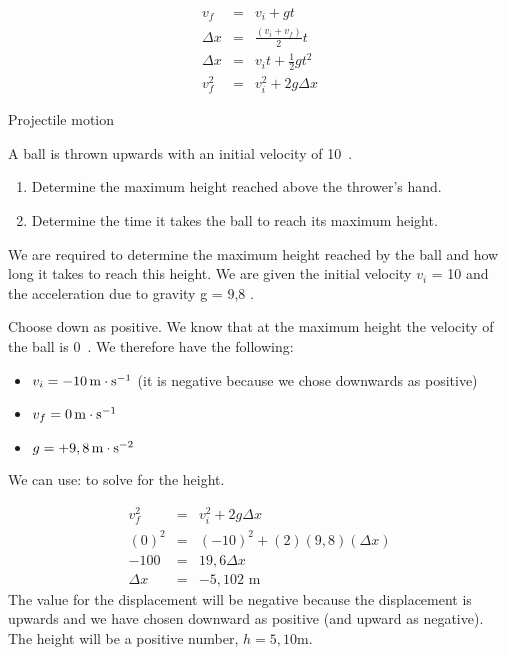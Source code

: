\begin{eqnarray}
v_f &=& v_i + gt \label{eq:pg:eq1}\\
\Delta x &=& \frac{(v_i + v_f)}{2} t\label{eq:pg:eq2}\\
\Delta x &=& v_it + \frac{1}{2}gt^2 \label{eq:pg:eq3}\\
v_f^2 &=& v_i^2 + 2g\Delta x \label{eq:pg:eq4}
\end{eqnarray}
\begin{wex}{Projectile motion}{A ball is thrown upwards with an initial velocity of 10~\ms. \\
\begin{minipage}{\textwidth}
\begin{enumerate}
	\item Determine the maximum height reached above the thrower's hand.
	\item Determine the time it takes the ball to reach its maximum height.
	\end{enumerate}
\end{minipage}}
{
We are required to determine the maximum height reached by the ball and how long it takes to reach this height. We are given the initial velocity $v_i$ = 10 \ms and the acceleration due to gravity g = 9,8 \mss.

Choose down as positive. We know that at the maximum height the velocity of the ball is 0~\ms. We therefore have the following:
\begin{itemize}
\item{$v_i=-10\,\mathrm{m \cdot s^{-1}}$ (it is negative because we chose downwards as positive)}
\item{$v_f=0\,\mathrm{m \cdot s^{-1}}$}
\item{$g=+9,8\,\mathrm{m \cdot s^{-2}}$}
\end{itemize}

We can use:
to solve for the height.

\begin{eqnarray*}
v_f^2 &=& v_i^2 + 2g\Delta x\\
(0)^{2} &=& (-10)^{2} + (2)(9,8)  (\Delta x)\\
-100 &=& 19,6 \Delta x\\
\Delta x &=& -5,102\text{ m}
\end{eqnarray*}
The value for the displacement will be negative because the displacement is upwards and we have chosen downward as positive (and upward as negative). The height will be a positive number, $h=5,10$m.

}
\end{wex}
